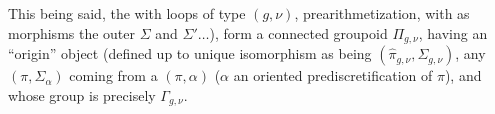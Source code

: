This being said, the 
  with loops of type $(g,\nu)$,
 prearithmetization,
with as morphisms the  outer 
 $\Sigma$ and $\Sigma'\ldots$),
form a connected groupoid $\Pi_{g,\nu}$, having an ``origin'' object
(defined up to unique isomorphism as being $(\widehat{\pi}_{g,\nu},\Sigma_{g,\nu})$,
 any $(\pi,\Sigma_{\alpha})$ coming from a
$(\pi,\alpha)$ ($\alpha$ an oriented prediscretification of $\pi$),
and whose group   is precisely $\Gamma_{g,\nu}$.

